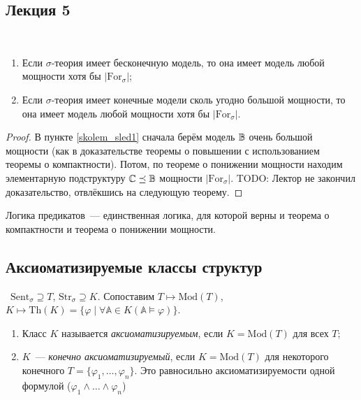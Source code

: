 \subsection{Лекция 5} 

\begin{stat} \ 
     
    \begin{enumerate}
        \item\label{skolem_sled1} Если $\sigma$-теория имеет бесконечную модель, то она имеет модель любой мощности хотя бы $|\text{For}_\sigma|$; 
        \item\label{skolem_sled2} Если $\sigma$-теория имеет конечные модели сколь угодно большой мощности, то она имеет модель любой мощности хотя бы $|\text{For}_\sigma|$. 
    \end{enumerate}
\end{stat}

\begin{proof}
    В пункте \ref{skolem_sled1} сначала берём модель ${\mathbb B}$ очень большой мощности (как в доказательстве теоремы о повышении с использованием теоремы о компактности). Потом, по теореме о понижении мощности находим элементарную подструктуру ${\mathbb C}\preceq{\mathbb B}$ мощности $|\text{For}_\sigma|$. TODO: Лектор не закончил доказательство, отвлёкшись на следующую теорему.
\end{proof} 

\begin{theorem}
    Логика предикатов~— единственная логика, для которой верны и теорема о компактности и теорема о понижении мощности.
\end{theorem}

\subsection{Аксиоматизируемые классы структур}

\begin{definition} \  
$\text{Sent}_\sigma \supseteq T$, $\text{Str}_\sigma \supseteq K$. Сопоставим $T \mapsto \text{Mod}(T)$, $K \mapsto \text{Th}(K) = \{\varphi \mid \forall \mathbb{A}\in K (\mathbb{A}\models \varphi)\}$.
    \begin{enumerate}
        \item  Класс $K$ называется \textit{аксиоматизируемым}, если $K = \text{Mod}(T)$ для всех $T$; 
        \item $K$~— \textit{конечно аксиоматизируемый}, если $K = \text{Mod}(T)$ для некоторого конечного $T = \{\varphi_1, \ldots, \varphi_n\}$. Это равносильно аксиоматизируемости одной формулой ($\varphi_1 \wedge \ldots \wedge \varphi_n$)
    \end{enumerate}
\end{definition}

